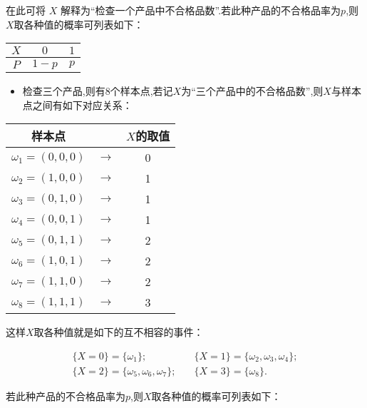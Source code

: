 在此可将 $ X $ 解释为“检查一个产品中不合格品数”.若此种产品的不合格品率为$ p $,则$ X $取各种值的概率可列表如下：

\begin{table}[htbp]
	\centering
	\begin{tabular}{c|cc}
		$ X $     & $ 0 $     & $ 1 $ \\\hline
		$ P $     & $ 1-p $   & $ p $ \\
	\end{tabular}%
\end{table}%


\begin{itemize}
	\item 检查三个产品,则有8个样本点,若记$X$为“三个产品中的不合格品数”,则$ X $与样本点之间有如下对应关系：
\end{itemize}

\begin{table}[htbp]
	\centering
	\begin{tabular}{ccc}
		样本点   &       & $ X $的取值 \\\hline
		$ \omega_1=(0,0,0) $ &   $ \longrightarrow $    & 0 \\
		$ \omega_2=(1,0,0) $ &   $ \longrightarrow $    & 1 \\
		$ \omega_3=(0,1,0) $ &   $ \longrightarrow $    & 1 \\
		$ \omega_4=(0,0,1) $ &   $ \longrightarrow $    & 1 \\
		$ \omega_5=(0,1,1) $ &   $ \longrightarrow $    & 2 \\
		$ \omega_6=(1,0,1) $ &   $ \longrightarrow $    & 2 \\
		$ \omega_7=(1,1,0) $ &   $ \longrightarrow $    & 2 \\
		$ \omega_8=(1,1,1) $ &   $ \longrightarrow $    & 3 \\
	\end{tabular}%
\end{table}%

这样$ X $取各种值就是如下的互不相容的事件：

\begin{equation}
\begin{array}{ll}
{ \{ X=0 \}=\{\omega_{1}\} ;} & \{  X=1 \}=\{\omega_{2}, \omega_{3}, \omega_{4} \}; \\
{ \{ X=2 \}=\{\omega_{5}, \omega_{6}, \omega_{7}\}};\quad &{\{ X=3\}=\{ \omega_{8} \}}.
\end{array}
\end{equation}

若此种产品的不合格品率为$ p $,则$ X $取各种值的概率可列表如下：

